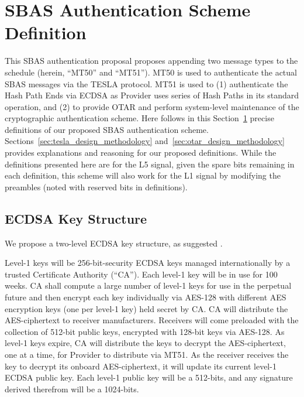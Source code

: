 \documentclass[APA,STIX1COL]{IONjournal/ION-APA Template}
\begin{document}
\section{SBAS Authentication Scheme Definition} \label{sec:sbas_authentication_scheme_definition}

	This SBAS authentication proposal proposes appending two message types to the schedule (herein, ``MT50'' and ``MT51'').
	MT50 is used to authenticate the actual SBAS messages via the TESLA protocol.
	MT51 is used to (1) authenticate the Hash Path Ends via ECDSA as Provider uses series of Hash Paths in its standard operation, and (2) to provide OTAR and perform system-level maintenance of the cryptographic authentication scheme.
	Here follows in this Section~\ref{sec:sbas_authentication_scheme_definition} precise definitions of our proposed SBAS authentication scheme.
	Sections~\ref{sec:tesla_design_methodology} and~\ref{sec:otar_design_methodology} provides explanations and reasoning for our proposed definitions.
	While the definitions presented here are for the L5 signal, given the spare bits remaining in each definition, this scheme will also work for the L1 signal by modifying the preambles (noted with reserved bits in definitions).

	\subsection{ECDSA Key Structure} \label{sub:ecdsa_key_structure}

		We propose a two-level ECDSA key structure, as suggested \cite{Neish_Dissertation}.

		Level-1 keys will be 256-bit-security ECDSA keys managed internationally by a trusted Certificate Authority (``CA'').
		Each level-1 key will be in use for 100 weeks.
		CA shall compute a large number of level-1 keys for use in the perpetual future and then encrypt each key individually via AES-128 with different AES encryption keys (one per level-1 key) held secret by CA.
		CA will distribute the AES-ciphertext to receiver manufacturers.
		Receivers will come preloaded with the collection of 512-bit public keys, encrypted with 128-bit keys via AES-128.
		As level-1 keys expire, CA will distribute the keys to decrypt the AES-ciphertext, one at a time, for Provider to distribute via MT51.
		As the receiver receives the key to decrypt its onboard AES-ciphertext, it will update its current level-1 ECDSA public key.
		Each level-1 public key will be a 512-bits, and any signature derived therefrom will be a 1024-bits.
\end{document}
